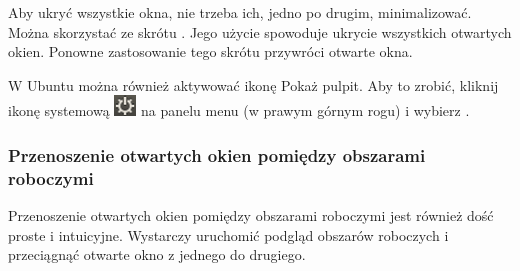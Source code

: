 Aby ukryć wszystkie okna, nie trzeba ich, jedno po drugim, minimalizować. Można skorzystać ze skrótu . Jego użycie spowoduje ukrycie wszystkich otwartych okien. Ponowne zastosowanie tego skrótu przywróci otwarte okna.

W Ubuntu można również aktywować ikonę \textcolor{ubuntu_orange}{Pokaż pulpit}. Aby to zrobić, kliknij ikonę systemową \includegraphics{images/ikony_zasilanie.png} na panelu menu (w prawym górnym rogu) i wybierz .

\subsubsection{Przenoszenie otwartych okien pomiędzy obszarami roboczymi}
Przenoszenie otwartych okien pomiędzy obszarami roboczymi jest również dość proste i intuicyjne. Wystarczy uruchomić podgląd obszarów roboczych i przeciągnąć otwarte okno z jednego do drugiego.

